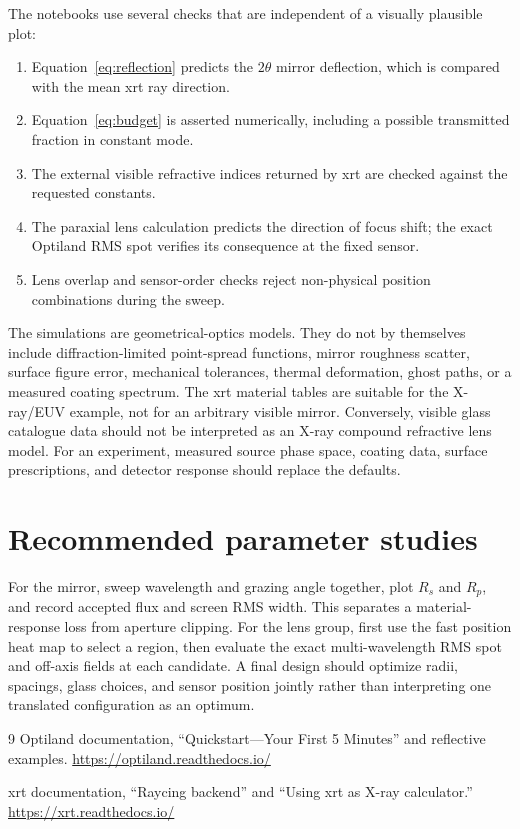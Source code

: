 \documentclass[11pt,a4paper]{article}
\begin{document}
The notebooks use several checks that are independent of a visually plausible
plot:
\begin{enumerate}
  \item Equation~\eqref{eq:reflection} predicts the $2\theta$ mirror
  deflection, which is compared with the mean xrt ray direction.
  \item Equation~\eqref{eq:budget} is asserted numerically, including a
  possible transmitted fraction in constant mode.
  \item The external visible refractive indices returned by xrt are checked
  against the requested constants.
  \item The paraxial lens calculation predicts the direction of focus shift;
  the exact Optiland RMS spot verifies its consequence at the fixed sensor.
  \item Lens overlap and sensor-order checks reject non-physical position
  combinations during the sweep.
\end{enumerate}

The simulations are geometrical-optics models.  They do not by themselves
include diffraction-limited point-spread functions, mirror roughness scatter,
surface figure error, mechanical tolerances, thermal deformation, ghost paths,
or a measured coating spectrum.  The xrt material tables are suitable for the
X-ray/EUV example, not for an arbitrary visible mirror.  Conversely, visible
glass catalogue data should not be interpreted as an X-ray compound refractive
lens model.  For an experiment, measured source phase space, coating data,
surface prescriptions, and detector response should replace the defaults.

\section{Recommended parameter studies}

For the mirror, sweep wavelength and grazing angle together, plot $R_s$ and
$R_p$, and record accepted flux and screen RMS width.  This separates a
material-response loss from aperture clipping.  For the lens group, first use
the fast position heat map to select a region, then evaluate the exact
multi-wavelength RMS spot and off-axis fields at each candidate.  A final design
should optimize radii, spacings, glass choices, and sensor position jointly
rather than interpreting one translated configuration as an optimum.

\begin{thebibliography}{9}
Optiland documentation, ``Quickstart---Your First 5 Minutes'' and reflective
examples.  \url{https://optiland.readthedocs.io/}

xrt documentation, ``Raycing backend'' and ``Using xrt as X-ray calculator.''
\url{https://xrt.readthedocs.io/}
\end{thebibliography}
\end{document}
